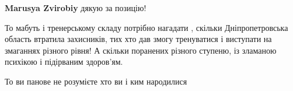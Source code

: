 \begin{itemize}
\begin{itemize}
\textbf{Marusya Zvirobiy} дякую за позицію!

\end{itemize}

 

То мабуть і тренерському складу потрібно нагадати , скільки Дніпропетровська
область втратила захисників, тих хто дав змогу тренуватися і виступати на
змаганнях різного рівня! А скільки поранених різного ступеню, із зламаною
психікою і підірваним здоров'ям.

То ви панове не розумієте хто ви і ким народилися

\end{itemize}

